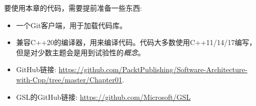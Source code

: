 要使用本章的代码，需要提前准备一些东西:

\begin{itemize}
\item 
一个Git客户端，用于加载代码库。

\item 
兼容C++20的编译器，用来编译代码。代码大多数使用C++11/14/17编写，但是对少数主题会是用到试验性的\textit{概念}。


\item 
GitHub链接: \url{https://github.com/PacktPublishing/Software-Architecture-with-Cpp/tree/master/Chapter01}.


\item 
GSL的GitHub链接: \url{https://github.com/Microsoft/GSL}

\end{itemize}